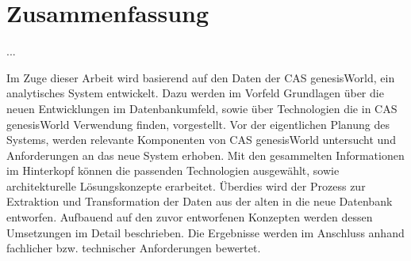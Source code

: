 
\chapter*{\centering Zusammenfassung}

...

Im Zuge dieser Arbeit wird basierend auf den Daten der CAS genesisWorld, ein analytisches System entwickelt. Dazu werden im Vorfeld Grundlagen über die neuen Entwicklungen im Datenbankumfeld, sowie über Technologien die in CAS genesisWorld Verwendung finden, vorgestellt. Vor der eigentlichen Planung des Systems, werden relevante Komponenten von CAS genesisWorld untersucht und Anforderungen an das neue System erhoben. Mit den gesammelten Informationen im Hinterkopf können die passenden Technologien ausgewählt, sowie architekturelle Lösungskonzepte erarbeitet. Überdies wird der Prozess zur Extraktion und Transformation der Daten aus der alten in die neue Datenbank entworfen. Aufbauend auf den zuvor entworfenen Konzepten werden dessen Umsetzungen im Detail beschrieben. Die Ergebnisse werden im Anschluss anhand fachlicher bzw. technischer Anforderungen bewertet.